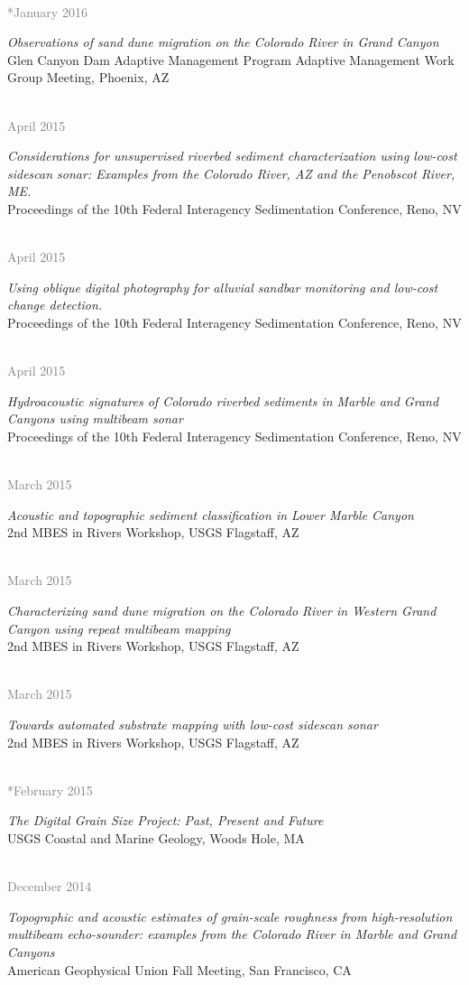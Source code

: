 \documentclass{article} %
\newlength\sidebarwidth
\newcommand{\dateonly}[2][]
	 {\begin{minipage}{\textwidth}
	 \vspace*{.4\baselineskip}
         \nopagebreak\hspace{0in}%
         \nopagebreak\begin{minipage}[t]{\sidebarwidth - .2cm}
         \raggedleft {~}
         {\\[-\baselineskip] \textcolor{gray}{\footnotesize #1}}
	 \end{minipage}%
	 \hfill
	 \begin{minipage}[t]{\linewidth - \sidebarwidth}
	 #2%
	 \end{minipage}%
	 \vspace*{.2\baselineskip plus 1\baselineskip minus
	 .2\baselineskip}%
	 \end{minipage}}
\begin{document}
  \dateonly[**January 2016]{
      {\it Observations of sand dune migration on the Colorado River in Grand Canyon}\\
      Glen Canyon Dam Adaptive Management Program Adaptive Management Work Group Meeting, Phoenix, AZ
  }

  \dateonly[April 2015]{
      {\it Considerations for unsupervised riverbed sediment characterization using low-cost sidescan sonar: Examples from the Colorado River, AZ and the Penobscot River, ME.}\\
      Proceedings of the 10th Federal Interagency Sedimentation Conference, Reno, NV
  }

  \dateonly[April 2015]{
      {\it Using oblique digital photography for alluvial sandbar monitoring and low-cost change detection.}\\
      Proceedings of the 10th Federal Interagency Sedimentation Conference, Reno, NV
  }

  \dateonly[April 2015]{
      {\it Hydroacoustic signatures of Colorado riverbed sediments in Marble and Grand Canyons using multibeam sonar}\\
      Proceedings of the 10th Federal Interagency Sedimentation Conference, Reno, NV
  }

  \dateonly[March 2015]{
      {\it Acoustic and topographic sediment classification in Lower Marble Canyon}\\
      2nd MBES in Rivers Workshop, USGS Flagstaff, AZ
  }

  \dateonly[March 2015]{
      {\it Characterizing sand dune migration on the Colorado River in Western Grand Canyon using repeat multibeam mapping}\\
      2nd MBES in Rivers Workshop, USGS Flagstaff, AZ
  }

  \dateonly[March 2015]{
      {\it Towards automated substrate mapping with low-cost sidescan sonar}\\
      2nd MBES in Rivers Workshop, USGS Flagstaff, AZ
  }

  \dateonly[**February 2015]{
      {\it The Digital Grain Size Project: Past, Present and Future}\\
      USGS Coastal and Marine Geology, Woods Hole, MA
  }

  \dateonly[December 2014]{
      {\it Topographic and acoustic estimates of grain-scale roughness from high-resolution multibeam echo-sounder: examples from the Colorado River in Marble and Grand Canyons}\\
      American Geophysical Union Fall Meeting, San Francisco, CA
  }
\end{document}
